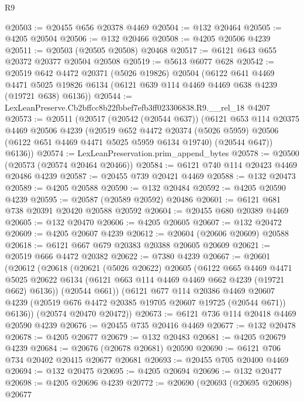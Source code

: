 \begin{lexlean}{R9}
\begin{coremodule}
@20503 := @20455 @656 @20378 @4469
@20504 := @132 @20464
@20505 := @4205 @20504
@20506 := @132 @20466
@20508 := @4205 @20506 @4239
@20511 := @20503 (@20505 @20508) @20468
@20517 := @6121 @643 @655 @20372 @20377 @20504 @20508
@20519 := @5613 @6077 @628
@20542 := @20519
    @642
    @4472
    @20371
    (@5026 @19826)
    @20504
    (@6122
      @641
      @4469
      @4471
      @5025
      @19826
      @6134
      (@6121 @639 @114 @4469 @4469 @638 @4239 (@19721 @638) @6136))
@20544 := LexLeanPreserve.Cb2bffcc8b22fbbef7efb3ff023306838.R9.__rel_18 @4207
@20573 := @20511
    (@20517
      (@20542 (@20544 @637))
      (@6121
        @653
        @114
        @20375
        @4469
        @20506
        @4239
        (@20519
          @652
          @4472
          @20374
          (@5026 @5959)
          @20506
          (@6122 @651 @4469 @4471 @5025 @5959 @6134 @19740)
          (@20544 @647))
        @6136))
@20574 := LexLeanPreservation.prim_append_bytes
@20578 := @20500 (@20573 (@20574 @20464 @20466))
@20584 := @6121 @740 @114 @20423 @4469 @20486 @4239
@20587 := @20455 @739 @20421 @4469
@20588 := @132 @20473
@20589 := @4205 @20588
@20590 := @132 @20484
@20592 := @4205 @20590 @4239
@20595 := @20587 (@20589 @20592) @20486
@20601 := @6121 @681 @738 @20391 @20420 @20588 @20592
@20604 := @20455 @680 @20389 @4469
@20605 := @132 @20470
@20606 := @4205 @20605
@20607 := @132 @20472
@20609 := @4205 @20607 @4239
@20612 := @20604 (@20606 @20609) @20588
@20618 := @6121 @667 @679 @20383 @20388 @20605 @20609
@20621 := @20519 @666 @4472 @20382
@20622 := @7380 @4239
@20667 := @20601
    (@20612
      (@20618
        (@20621
          (@5026 @20622)
          @20605
          (@6122
            @665
            @4469
            @4471
            @5025
            @20622
            @6134
            (@6121 @663 @114 @4469 @4469 @662 @4239 (@19721 @662) @6136))
          (@20544 @661))
        (@6121
          @677
          @114
          @20386
          @4469
          @20607
          @4239
          (@20519 @676 @4472 @20385 @19705 @20607 @19725 (@20544 @671))
          @6136))
      (@20574 @20470 @20472))
@20673 := @6121 @736 @114 @20418 @4469 @20590 @4239
@20676 := @20455 @735 @20416 @4469
@20677 := @132 @20478
@20678 := @4205 @20677
@20679 := @132 @20483
@20681 := @4205 @20679 @4239
@20684 := @20676 (@20678 @20681) @20590
@20690 := @6121 @706 @734 @20402 @20415 @20677 @20681
@20693 := @20455 @705 @20400 @4469
@20694 := @132 @20475
@20695 := @4205 @20694
@20696 := @132 @20477
@20698 := @4205 @20696 @4239
@20772 := @20690
    (@20693
      (@20695 @20698)
      @20677

\end{coremodule}
\end{lexlean}
